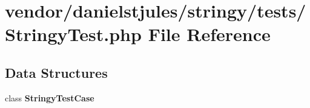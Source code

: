 \section{vendor/danielstjules/stringy/tests/\+Stringy\+Test.php File Reference}
\label{_stringy_test_8php}
\subsection*{Data Structures}
\begin{DoxyCompactItemize}
\item 
class {\bf Stringy\+Test\+Case}
\end{DoxyCompactItemize}
